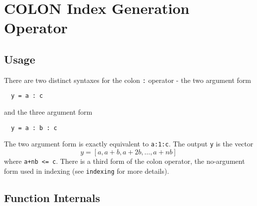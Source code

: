\section{COLON Index Generation Operator}

\subsection{Usage}

There are two distinct syntaxes for the colon \verb|:| operator - the two argument form
\begin{verbatim}
  y = a : c
\end{verbatim}
and the three argument form
\begin{verbatim}
  y = a : b : c
\end{verbatim}
The two argument form is exactly equivalent to \verb|a:1:c|.  The output \verb|y| is the vector
\[
  y = [a,a+b,a+2b,\ldots,a+nb]
\]
where \verb|a+nb <= c|.  There is a third form of the colon operator, the
no-argument form used in indexing (see \verb|indexing| for more details).
\subsection{Function Internals}

